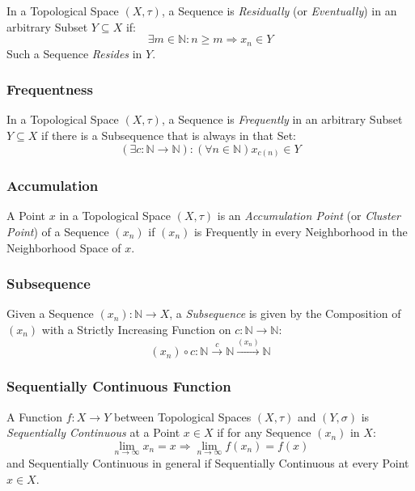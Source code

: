 In a Topological Space $(X, \tau)$, a Sequence is \emph{Residually}
(or \emph{Eventually}) in an arbitrary Subset $Y \subseteq X$ if:
\[
  \exists m \in \mathbb{N} : n \geq m \Rightarrow x_n \in Y
\]
Such a Sequence \emph{Resides} in $Y$.



\subsubsection{Frequentness}\label{sec:frequent}

In a Topological Space $(X, \tau)$, a Sequence is \emph{Frequently}
in an arbitrary Subset $Y \subseteq X$ if there is a Subsequence that
is always in that Set:
\[
  (\exists c : \mathbb{N} \rightarrow \mathbb{N})
  : (\forall n \in \mathbb{N}) x_{c(n)} \in Y
\]



\subsubsection{Accumulation}\label{sec:accumulation}

A Point $x$ in a Topological Space $(X, \tau)$ is an
\emph{Accumulation Point} (or \emph{Cluster Point}) of a Sequence
$(x_n)$ if $(x_n)$ is Frequently in every Neighborhood in the
Neighborhood Space of $x$.



\subsubsection{Subsequence}\label{sec:subsequence_topology}

Given a Sequence $(x_n) : \mathbb{N} \rightarrow X$, a
\emph{Subsequence} is given by the Composition of $(x_n)$ with a
Strictly Increasing Function on $c : \mathbb{N} \rightarrow
\mathbb{N}$:
\[
  (x_n) \circ c :
  \mathbb{N} \xrightarrow{c} \mathbb{N} \xrightarrow{(x_n)} \mathbb{N}
\]



\subsubsection{Sequentially Continuous Function}
\label{sec:sequentially_continuous}

A Function $f : X \rightarrow Y$ between Topological Spaces $(X,
\tau)$ and $(Y, \sigma)$ is \emph{Sequentially Continuous} at a Point
$x \in X$ if for any Sequence $(x_n)$ in $X$:
\[
  \lim_{n \rightarrow \infty} x_n = x
  \Rightarrow \lim_{n \rightarrow \infty} f(x_n) = f(x)
\]
and Sequentially Continuous in general if Sequentially Continuous at
every Point $x \in X$.

